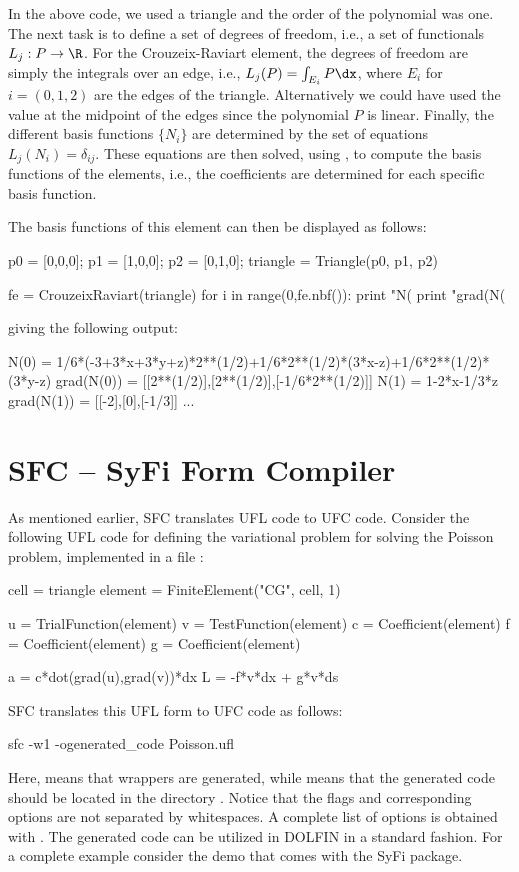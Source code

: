 In the above code, we used a triangle and the order of the polynomial
was one. The next task is to define a set of degrees of freedom, i.e.,
a set of functionals $L_j : P \rightarrow \R$.  For the Crouzeix-Raviart
element, the degrees of freedom are simply the integrals over an edge,
i.e., $L_j(P) = \int_{E_i} P \dx$, where $E_i$ for $i=(0,1,2)$ are the
edges of the triangle. Alternatively we could have used the value at
the midpoint of the edges since the polynomial $P$ is linear.  Finally,
the different basis functions $\{N_i\}$ are determined by the set of
equations $L_j(N_i) = \delta_{ij}$.  These equations are then solved,
using , to compute the basis functions of the elements,
i.e., the coefficients \emp{[a0\_0, a0\_1, a0\_2]} are determined for
each specific basis function.

The basis functions of this element can then be displayed as follows:
\begin{python}
p0 = [0,0,0]; p1 = [1,0,0]; p2 = [0,1,0];
triangle = Triangle(p0, p1, p2)

fe = CrouzeixRaviart(triangle)
for i in range(0,fe.nbf()):
  print "N(%
  print "grad(N(%
\end{python}
giving the following output:
\begin{c++}
N(0)       =  1/6*(-3+3*x+3*y+z)*2**(1/2)+1/6*2**(1/2)*(3*x-z)+1/6*2**(1/2)*(3*y-z)
grad(N(0)) =  [[2**(1/2)],[2**(1/2)],[-1/6*2**(1/2)]]
N(1)       =  1-2*x-1/3*z
grad(N(1)) =  [[-2],[0],[-1/3]]
...
\end{c++}



\section{SFC -- SyFi Form Compiler}

As mentioned earlier, SFC translates UFL code to UFC code. Consider the
following UFL code for defining the variational problem for solving the
Poisson problem, implemented in a file :
\begin{python}
cell = triangle
element = FiniteElement("CG", cell, 1)

u = TrialFunction(element)
v = TestFunction(element)
c = Coefficient(element)
f = Coefficient(element)
g = Coefficient(element)

a = c*dot(grad(u),grad(v))*dx
L = -f*v*dx + g*v*ds
\end{python}
SFC translates this UFL form to UFC code as follows:
\begin{bash}
sfc -w1  -ogenerated_code Poisson.ufl
\end{bash}
Here,  means that \dolfin wrappers are generated, while
 means that the generated code should be
located in the directory . Notice that the flags
and corresponding options are not separated by whitespaces. A complete
list of options is obtained with .  The generated code can be
utilized in DOLFIN in a standard fashion.  For a complete example consider
the demo  that comes with the SyFi package.

